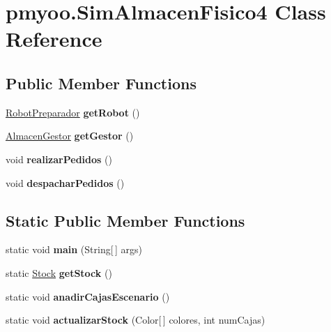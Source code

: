 \hypertarget{classpmyoo_1_1_sim_almacen_fisico4}{}\section{pmyoo.\+Sim\+Almacen\+Fisico4 Class Reference}
\label{classpmyoo_1_1_sim_almacen_fisico4}
\subsection*{Public Member Functions}
\begin{DoxyCompactItemize}
\item 
\mbox{\label{classpmyoo_1_1_sim_almacen_fisico4_a2c1c43fd0121f77bc57ba95da5bd8437}} 
\mbox{\hyperlink{classpmyoo_1_1_robot_preparador}{Robot\+Preparador}} {\bfseries get\+Robot} ()
\item 
\mbox{\label{classpmyoo_1_1_sim_almacen_fisico4_a5a434ea14590b500b2b4f73030e7d9c4}} 
\mbox{\hyperlink{classpmyoo_1_1_almacen_gestor}{Almacen\+Gestor}} {\bfseries get\+Gestor} ()
\item 
\mbox{\label{classpmyoo_1_1_sim_almacen_fisico4_ab01d73638d950a8c4e9dad77143062aa}} 
void {\bfseries realizar\+Pedidos} ()
\item 
\mbox{\label{classpmyoo_1_1_sim_almacen_fisico4_a6e1c2e9aa04917df98d22a51406dd1a4}} 
void {\bfseries despachar\+Pedidos} ()
\end{DoxyCompactItemize}
\subsection*{Static Public Member Functions}
\begin{DoxyCompactItemize}
\item 
\mbox{\label{classpmyoo_1_1_sim_almacen_fisico4_a5cf03bbc271c996bbee07f4996eab08e}} 
static void {\bfseries main} (String\mbox{[}$\,$\mbox{]} args)
\item 
\mbox{\label{classpmyoo_1_1_sim_almacen_fisico4_a93d14956d5c1662021a781ae7640f89e}} 
static \mbox{\hyperlink{classpmyoo_1_1_stock}{Stock}} {\bfseries get\+Stock} ()
\item 
\mbox{\label{classpmyoo_1_1_sim_almacen_fisico4_a909e38858db0ce532dfc0f75336f266b}} 
static void {\bfseries anadir\+Cajas\+Escenario} ()
\item 
\mbox{\label{classpmyoo_1_1_sim_almacen_fisico4_a78db559c4a4658045f617966fe6cbd8f}} 
static void {\bfseries actualizar\+Stock} (Color\mbox{[}$\,$\mbox{]} colores, int num\+Cajas)
\end{DoxyCompactItemize}


